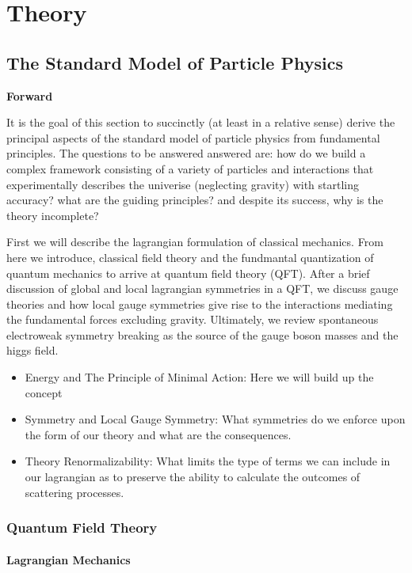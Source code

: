 \chapter{Theory}

\section{The Standard Model of Particle Physics}

\textbf{Forward}

It is the goal of this section to succinctly (at least in a relative sense) derive the 
principal aspects of the standard model of particle physics from fundamental principles. 
The questions to be answered answered are: how do we build a complex framework consisting of 
a variety of particles and interactions that  experimentally describes the univerise (neglecting
 gravity) with startling accuracy? what are the guiding principles? and despite its success, why
is the theory incomplete?

First we will describe the lagrangian formulation of classical mechanics. From here we introduce, 
classical field theory and the fundmantal quantization of quantum mechanics to arrive at quantum field
theory (QFT). After a brief discussion of global and local lagrangian symmetries in a QFT, we discuss
gauge theories and how local gauge symmetries give rise to the interactions mediating the 
fundamental forces excluding gravity. Ultimately, we review spontaneous 
electroweak symmetry breaking as the source of the gauge boson masses and the higgs field. 

\begin{itemize}
\item Energy and The Principle of Minimal Action: Here we will build up the concept
\item Symmetry and Local Gauge Symmetry: What symmetries do we enforce upon the form of our theory
and what are the consequences.
\item Theory Renormalizability: What limits the type of terms we can include in our lagrangian as to preserve
the ability to calculate the outcomes of  scattering processes. 
\end{itemize}



\subsection{Quantum Field Theory}

\subsubsection{Lagrangian Mechanics}

